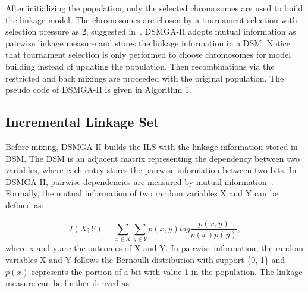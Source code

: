 \documentclass{sig-alternate-05-2015}
\begin{document}
After initializing the population, only the selected chromosomes are used to build the linkage model. The chromosomes are chosen by a tournament selection with selection pressure as 2, suggested in~\cite{yu:population}. DSMGA-II adopts mutual information as pairwise linkage measure and stores the linkage information in a DSM. Notice that tournament selection is only performed to choose chromosomes for model building instead of updating the population. Then recombinations via the restricted and back mixings are  proceeded with the original population. The pseudo code of DSMGA-II is given in Algorithm 1.





\subsection{Incremental Linkage Set}
Before mixing, DSMGA-II builds the ILS with the linkage information stored in DSM. The DSM is an adjacent matrix representing the dependency between two variables, where each entry stores the pairwise information between two bits. In DSMGA-II, pairwise dependencies are measured by mutual information~\cite{kullback:KL-diversion}. Formally, the mutual information of two random variables X and Y can be defined as:

\begin{displaymath} 
I(X;Y) = \sum_{x \in X}\sum_{y \in Y} p(x,y)  log \frac{p(x,y)}{p(x) p(y)}, 
\end{displaymath}
where x and y are the outcomes of X and Y. In pairwise information, the random variables X and Y follows the Bernoulli distribution with support \{0, 1\} and $p(x)$ represents the portion of a bit with value 1 in the population. The linkage measure can be further derived as:
\end{document}
